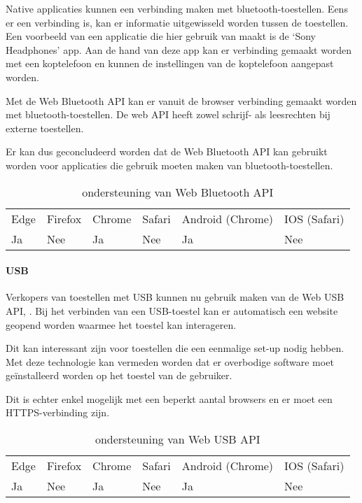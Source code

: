 Native applicaties kunnen een verbinding maken met bluetooth-toestellen. Eens er een verbinding is, kan er informatie uitgewisseld worden tussen de toestellen. Een voorbeeld van een applicatie die hier gebruik van maakt is de ‘Sony Headphones’ app. Aan de hand van deze app kan er verbinding gemaakt worden met een koptelefoon en kunnen de instellingen van de koptelefoon aangepast worden.

Met de Web Bluetooth API \autocite{Grant2020} kan er vanuit de browser verbinding gemaakt worden met bluetooth-toestellen. De web API heeft zowel schrijf- als leesrechten bij externe toestellen. 

Er kan dus geconcludeerd worden dat de Web Bluetooth API kan gebruikt worden voor applicaties die gebruik moeten maken van bluetooth-toestellen.

\autocite{Beaufort2019a}

\begin{table}[]
	\begin{tabular}{llllll}
		Edge & Firefox & Chrome & Safari & Android (Chrome) & IOS (Safari) \\
		Ja   & Nee      & Ja     & Nee     & Ja               & Nee          
	\end{tabular}	
	\caption{ondersteuning van Web Bluetooth API}
	\label{ondersteuning van Web Bluetooth API}
\end{table}



\paragraph{USB}

Verkopers van toestellen met USB kunnen nu gebruik maken van de Web USB API, \autocite{Rockot2020}. Bij het verbinden van een USB-toestel kan er automatisch een website geopend worden waarmee het toestel kan interageren.
 
Dit kan interessant zijn voor toestellen die een eenmalige set-up nodig hebben. Met deze technologie kan vermeden worden dat er overbodige software moet geïnstalleerd worden op het toestel van de gebruiker. 

Dit is echter enkel mogelijk met een beperkt aantal browsers en er moet een HTTPS-verbinding zijn.

\autocite{Beaufort2019b}

\begin{table}[]
	\begin{tabular}{llllll}
		Edge & Firefox & Chrome & Safari & Android (Chrome) & IOS (Safari) \\
		Ja   & Nee      & Ja     & Nee     & Ja               & Nee          
	\end{tabular}	
	\caption{ondersteuning van Web USB API}
	\label{ondersteuning van Web USB API}
\end{table}


